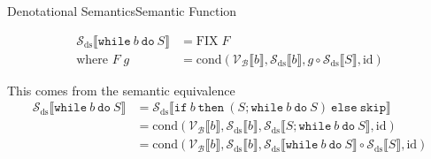 \documentclass{beamer}
\newcommand{\sskip}{\texttt{skip}}
\newcommand{\ifelse}[3]{\mathtt{if}\ #1\ \mathtt{then}\ #2\ \mathtt{else}\ #3}
\newcommand{\while}[2]{\mathtt{while}\ #1\ \mathtt{do}\ #2}
\newcommand{\sem}[2]{\mathcal{#1} \llbracket #2 \rrbracket}
\begin{document}
\begin{frame}{Denotational Semantics}{Semantic Function}
\begin{overprint}
        \begin{align*}
            \sem{S_{\mathrm{ds}}}{\while{b}{S}} & =
            \mathrm{FIX}\;F                         \\
            \mbox{where } F\;g                  & =
            \mathrm{cond}(\sem{V_B}{b}, \sem{S_\mathrm{ds}}{b}, g \circ \sem{S_{\mathrm{ds}}}{S},\mathrm{id})
        \end{align*}

        This comes from the semantic equivalence
        \begin{align*}
            \sem{S_{\mathrm{ds}}}{\while{b}{S}}
             & = \sem{S_{\mathrm{ds}}}{\ifelse{b}{(S; \while{b}{S})}{\sskip}}                                                                        \\
             & = \mathrm{cond}(\sem{V_B}{b}, \sem{S_\mathrm{ds}}{b}, \sem{S_{\mathrm{ds}}}{S; \while{b}{S}},\mathrm{id})                             \\
             & = \mathrm{cond}(\sem{V_B}{b}, \sem{S_\mathrm{ds}}{b}, \sem{S_{\mathrm{ds}}}{\while{b}{S}} \circ \sem{S_{\mathrm{ds}}}{S},\mathrm{id})
        \end{align*}
    \end{overprint}

\end{frame}
\end{document}
